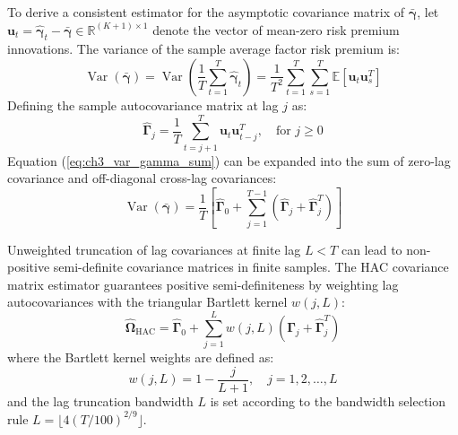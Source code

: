 To derive a consistent estimator for the asymptotic covariance matrix of $\bar{\boldsymbol{\gamma}}$, let $\mathbf{u}_t = \hat{\boldsymbol{\gamma}}_t - \bar{\boldsymbol{\gamma}} \in \mathbb{R}^{(K+1) \times 1}$ denote the vector of mean-zero risk premium innovations. The variance of the sample average factor risk premium is:
\begin{equation}
\operatorname{Var}(\bar{\boldsymbol{\gamma}}) = \operatorname{Var}\left( \frac{1}{T} \sum_{t=1}^T \hat{\boldsymbol{\gamma}}_t \right) = \frac{1}{T^2} \sum_{t=1}^T \sum_{s=1}^T \mathbb{E}\left[ \mathbf{u}_t \mathbf{u}_s^T \right]
\label{eq:ch3_var_gamma_sum}
\end{equation}
Defining the sample autocovariance matrix at lag $j$ as:
\begin{equation}
\hat{\mathbf{\Gamma}}_j = \frac{1}{T} \sum_{t=j+1}^T \mathbf{u}_t \mathbf{u}_{t-j}^T, \quad \text{for } j \ge 0
\label{eq:ch3_autocovariance}
\end{equation}
Equation (\ref{eq:ch3_var_gamma_sum}) can be expanded into the sum of zero-lag covariance and off-diagonal cross-lag covariances:
\begin{equation}
\operatorname{Var}(\bar{\boldsymbol{\gamma}}) = \frac{1}{T} \left[ \hat{\mathbf{\Gamma}}_0 + \sum_{j=1}^{T-1} \left( \hat{\mathbf{\Gamma}}_j + \hat{\mathbf{\Gamma}}_j^T \right) \right]
\end{equation}

Unweighted truncation of lag covariances at finite lag $L < T$ can lead to non-positive semi-definite covariance matrices in finite samples. The \citet{newey1987simple} HAC covariance matrix estimator guarantees positive semi-definiteness by weighting lag autocovariances with the triangular Bartlett kernel $w(j,L)$:
\begin{equation}
\widehat{\mathbf{\Omega}}_{\text{HAC}} = \hat{\mathbf{\Gamma}}_0 + \sum_{j=1}^L w(j, L) \left( \hat{\mathbf{\Gamma}}_j + \hat{\mathbf{\Gamma}}_j^T \right)
\label{eq:ch3_newey_west_omega}
\end{equation}
where the Bartlett kernel weights are defined as:
\begin{equation}
w(j, L) = 1 - \frac{j}{L+1}, \quad j = 1, 2, \dots, L
\label{eq:ch3_bartlett_kernel}
\end{equation}
and the lag truncation bandwidth $L$ is set according to the bandwidth selection rule $L = \lfloor 4 (T / 100)^{2/9} \rfloor$.

